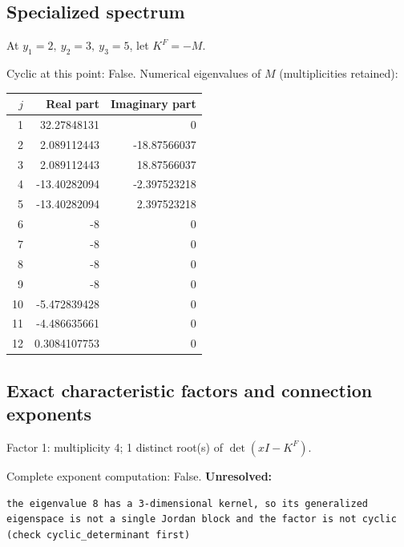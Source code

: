 \documentclass[10pt,a4paper]{article}
\newcommand{\fitmath}[1]{\sbox{\mathbox}{$\displaystyle #1$}\ifdim\wd\mathbox>\linewidth\resizebox{\linewidth}{!}{\usebox{\mathbox}}\else\usebox{\mathbox}\fi}
\begin{document}
\subsection*{Specialized spectrum}
At $y_1=2,\ y_2=3,\ y_3=5$, let $K^F=-M$.
\begin{center}\fitmath{\Delta=0}\end{center}
Cyclic at this point: False.
Numerical eigenvalues of $M$ (multiplicities retained):
\begin{center}\small\begin{tabular}{rrr}\toprule $j$ & Real part & Imaginary part\\\midrule
1 & 32.27848131 & 0\\
2 & 2.089112443 & -18.87566037\\
3 & 2.089112443 & 18.87566037\\
4 & -13.40282094 & -2.397523218\\
5 & -13.40282094 & 2.397523218\\
6 & -8 & 0\\
7 & -8 & 0\\
8 & -8 & 0\\
9 & -8 & 0\\
10 & -5.472839428 & 0\\
11 & -4.486635661 & 0\\
12 & 0.3084107753 & 0\\
\bottomrule\end{tabular}\end{center}
\subsection*{Exact characteristic factors and connection exponents}
Factor 1: multiplicity 4; 1 distinct root(s) of $\det(xI-K^F)$.
\begin{center}\fitmath{\begin{aligned}p_{1}(x)&=x - 8\end{aligned}}\end{center}
Complete exponent computation: False.
\textbf{Unresolved:}

\begin{lstlisting}
the eigenvalue 8 has a 3-dimensional kernel, so its generalized eigenspace is not a single Jordan block and the factor is not cyclic (check cyclic_determinant first)
\end{lstlisting}
\end{document}
